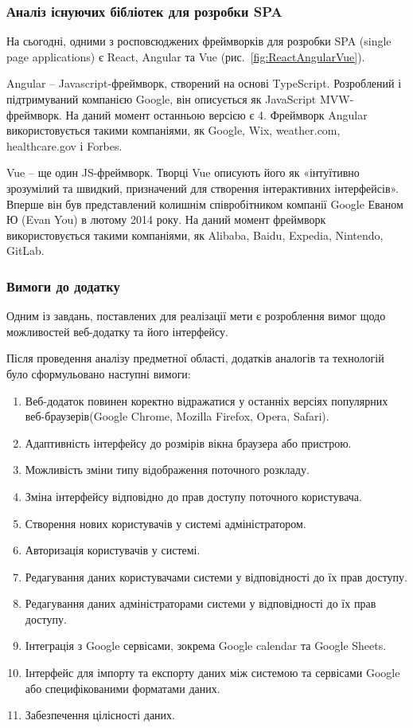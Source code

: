 \subsubsection{Аналіз існуючих бібліотек для розробки SPA}

На сьогодні, одними з росповсюджених фреймворків для розробки SPA (single page applications) є React, Angular та Vue (рис.~\ref{fig:ReactAngularVue}).


Angular -- Javascript-фреймворк, створений на основі TypeScript. Розроблений і підтримуваний компанією Google, він описується як JavaScript MVW-фреймворк. На даний момент останньою версією є 4. Фреймворк Angular використовується такими компаніями, як Google, Wix, weather.com, healthcare.gov і Forbes.

\label{subs:vue}
Vue -- ще один JS-фреймворк. Творці Vue описують його як «інтуїтивно зрозумілий та швидкий, призначений для створення інтерактивних інтерфейсів». Вперше він був представлений колишнім співробітником компанії Google Еваном Ю (Evan You) в лютому 2014 року. На даний момент фреймворк використовується такими компаніями, як Alibaba, Baidu, Expedia, Nintendo, GitLab.

\subsubsection{Вимоги до додатку}

Одним із завдань, поставлених для реалізації мети є розроблення вимог щодо можливостей веб-додатку та його інтерфейсу.

Після проведення аналізу предметної області, додатків аналогів та технологій було сформульовано наступні вимоги:

\begin{enumerate}
    \item Веб-додаток повинен коректно відражатися у останніх версіях популярних веб-браузерів(Google Chrome, Mozilla Firefox, Opera, Safari).
    \item Адаптивність інтерфейсу до розмірів вікна браузера або пристрою.
    \item Можливість зміни типу відображення поточного розкладу.
    \item Зміна інтерфейсу відповідно до прав доступу поточного користувача.
    \item Створення нових користувачів у системі адміністратором.
    \item Авторизація користувачів у системі.
    \item Редагування даних користувачами системи у відповідності до їх прав доступу.
    \item Редагування даних адміністраторами системи у відповідності до їх прав доступу.
    \item Інтеграція з Google сервісами, зокрема Google calendar та Google Sheets.
    \item Інтерфейс для імпорту та експорту даних між системою та сервісами Google або специфікованими форматами даних.
    \item Забезпечення цілісності даних.
\end{enumerate}


